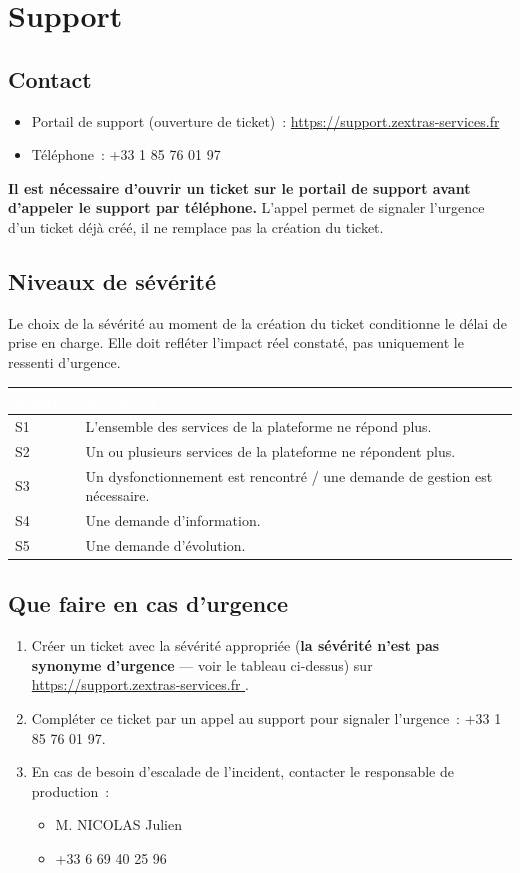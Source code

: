 \documentclass[11pt,a4paper]{report}
\newcommand{\tblhead}[1]{\textcolor{white}{\textbf{#1}}}
\begin{document}
\chapter{Support}

\section{Contact}
\begin{itemize}[nosep]
  \item Portail de support (ouverture de ticket)~: \url{https://support.zextras-services.fr }
  \item Téléphone~: +33 1 85 76 01 97
\end{itemize}
\textbf{Il est nécessaire d'ouvrir un ticket sur le portail de support avant d'appeler le support par téléphone.} L'appel permet de signaler l'urgence d'un ticket déjà créé, il ne remplace pas la création du ticket.

\section{Niveaux de sévérité}
Le choix de la sévérité au moment de la création du ticket conditionne le délai de prise en charge. Elle doit refléter l'impact réel constaté, pas uniquement le ressenti d'urgence.

\begin{longtable}{|p{1.3cm}|p{11cm}|}
\hline
\rowcolor{primary}\tblhead{Sévérité} & \tblhead{Définition} \\
\hline
\endhead
S1 & L'ensemble des services de la plateforme ne répond plus. \\
\hline
S2 & Un ou plusieurs services de la plateforme ne répondent plus. \\
\hline
S3 & Un dysfonctionnement est rencontré / une demande de gestion est nécessaire. \\
\hline
S4 & Une demande d'information. \\
\hline
S5 & Une demande d'évolution. \\
\hline
\end{longtable}

\section{Que faire en cas d'urgence}
\begin{enumerate}[nosep]
  \item Créer un ticket avec la sévérité appropriée (\textbf{la sévérité n'est pas synonyme d'urgence} --- voir le tableau ci-dessus) sur \url{https://support.zextras-services.fr }.
  \item Compléter ce ticket par un appel au support pour signaler l'urgence~: +33 1 85 76 01 97.
  \item En cas de besoin d'escalade de l'incident, contacter le responsable de production~:
  \begin{itemize}[nosep]
    \item M.\allowbreak{} NICOLAS Julien
    \item +33 6 69 40 25 96
  \end{itemize}
\end{enumerate}
\end{document}
